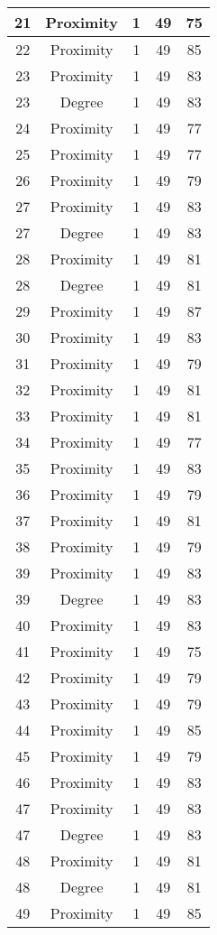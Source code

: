 \documentclass[results.tex]{subfiles}
\begin{document}
\begin{center}
\begin{tabular}{| c || c | c | c | c |}
    \hline
    21 & Proximity & 1 & 49 & 75 \\ 
    \hline
    22 & Proximity & 1 & 49 & 85 \\ 
    \hline
    23 & Proximity & 1 & 49 & 83 \\ 
    \hline
    23 & Degree & 1 & 49 & 83 \\ 
    \hline
    24 & Proximity & 1 & 49 & 77 \\ 
    \hline
    25 & Proximity & 1 & 49 & 77 \\ 
    \hline
    26 & Proximity & 1 & 49 & 79 \\ 
    \hline
    27 & Proximity & 1 & 49 & 83 \\ 
    \hline
    27 & Degree & 1 & 49 & 83 \\ 
    \hline
    28 & Proximity & 1 & 49 & 81 \\ 
    \hline
    28 & Degree & 1 & 49 & 81 \\ 
    \hline
    29 & Proximity & 1 & 49 & 87 \\ 
    \hline
    30 & Proximity & 1 & 49 & 83 \\ 
    \hline
    31 & Proximity & 1 & 49 & 79 \\ 
    \hline
    32 & Proximity & 1 & 49 & 81 \\ 
    \hline
    33 & Proximity & 1 & 49 & 81 \\ 
    \hline
    34 & Proximity & 1 & 49 & 77 \\ 
    \hline
    35 & Proximity & 1 & 49 & 83 \\ 
    \hline
    36 & Proximity & 1 & 49 & 79 \\ 
    \hline
    37 & Proximity & 1 & 49 & 81 \\ 
    \hline
    38 & Proximity & 1 & 49 & 79 \\ 
    \hline
    39 & Proximity & 1 & 49 & 83 \\ 
    \hline
    39 & Degree & 1 & 49 & 83 \\ 
    \hline
    40 & Proximity & 1 & 49 & 83 \\ 
    \hline
    41 & Proximity & 1 & 49 & 75 \\ 
    \hline
    42 & Proximity & 1 & 49 & 79 \\ 
    \hline
    43 & Proximity & 1 & 49 & 79 \\ 
    \hline
    44 & Proximity & 1 & 49 & 85 \\ 
    \hline
    45 & Proximity & 1 & 49 & 79 \\ 
    \hline
    46 & Proximity & 1 & 49 & 83 \\ 
    \hline
    47 & Proximity & 1 & 49 & 83 \\ 
    \hline
    47 & Degree & 1 & 49 & 83 \\ 
    \hline
    48 & Proximity & 1 & 49 & 81 \\ 
    \hline
    48 & Degree & 1 & 49 & 81 \\ 
    \hline
    49 & Proximity & 1 & 49 & 85 \\ 
    \hline   \end{tabular}
\end{center}
\end{document}

